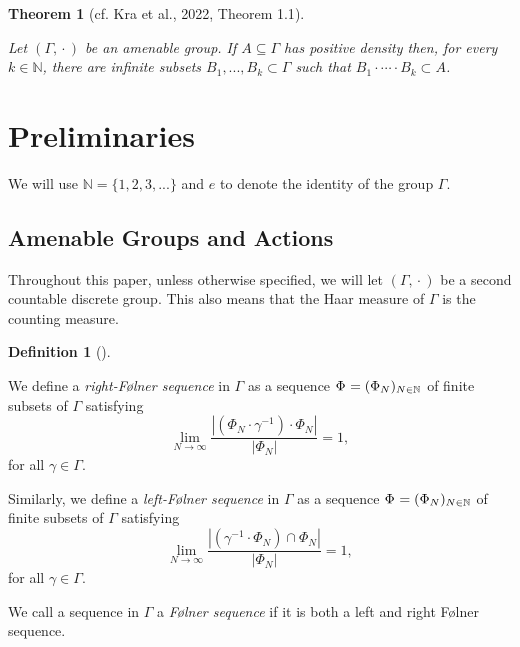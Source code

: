 \documentclass[
  british,
]{article}
\theoremstyle{definition}
\newtheorem{definition}{Definition}[section]
\theoremstyle{plain}
\theoremstyle{plain}
\newtheorem{theorem}{Theorem}[section]
\theoremstyle{plain}
\theoremstyle{remark}
\newcommand{\AmenableGroup}{{\Gamma}}
\newcommand{\CountingMeasure}[1]{{\left|#1\right|}}
\newcommand{\Folner}[1][\vphantom{}]{{\Phi}_{#1}}
\newcommand{\Group}{{\Gamma}}
\newcommand{\GroupElement}{{\gamma}}
\newcommand{\GroupOperation}[2]{{#1}\cdot{#2}}
\newcommand{\Identity}{{e}}
\newcommand{\Inverse}[1]{{#1}^{-1}}
\newcommand{\N}{\mathbb{N}}
\begin{document}
\begin{theorem}[{cf. Kra et al., 2022, Theorem
1.1}]\protect\hypertarget{thm-GenNErdosConjComb}{}\label{thm-GenNErdosConjComb}

Let \((\AmenableGroup,\GroupOperation{}{})\) be an amenable group. If
\(A\subseteq\AmenableGroup\) has positive density then, for every
\(k\in\N\), there are infinite subsets
\(B_1,...,B_k\subset\AmenableGroup\) such that
\(B_1\cdot\cdots\cdot B_k\subset A\).

\end{theorem}

\section{Preliminaries}\label{preliminaries}

We will use \(\N=\{1,2,3,...\}\) and \(\Identity\) to denote the
identity of the group \(\AmenableGroup\).

\subsection{Amenable Groups and
Actions}\label{amenable-groups-and-actions}

Throughout this paper, unless otherwise specified, we will let
\((\AmenableGroup,\GroupOperation{}{})\) be a second countable discrete
group. This also means that the Haar measure of \(\AmenableGroup\) is
the counting measure.

\begin{definition}[]\protect\hypertarget{def-FolnerSequenceDef}{}\label{def-FolnerSequenceDef}

We define a \emph{right-Følner sequence} in \(\Group\) as a sequence
\(\Folner =(\Folner[N])_{N\in\mathbb{N}}\) of finite subsets of
\(\Group\) satisfying
\[\lim_{N\rightarrow\infty}\frac{\CountingMeasure{\GroupOperation{(\GroupOperation{\Folner[N]}{\Inverse{\GroupElement}})}{\Folner[N]}}}{\CountingMeasure{\Folner[N]}}=1,\]
for all \(\GroupElement\in\Group\).

Similarly, we define a \emph{left-Følner sequence} in \(\Group\) as a
sequence \(\Folner =(\Folner[N])_{N\in\mathbb{N}}\) of finite subsets of
\(\Group\) satisfying
\[\lim_{N\rightarrow\infty}\frac{\CountingMeasure{(\Inverse{\GroupElement}\cdot\Folner[N])\cap\Folner[N]}}{\CountingMeasure{\Folner[N]}}=1,\]
for all \(\GroupElement\in\Group\).

We call a sequence in \(\Group\) a \emph{Følner sequence} if it is both
a left and right Følner sequence.

\end{definition}
\end{document}

